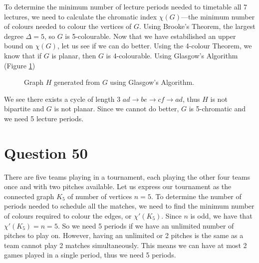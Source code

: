 \documentclass[11pt, oneside]{article}   	%
\begin{document}
To determine the minimum number of lecture periods needed to timetable all 7 lectures, we need to calculate the chromatic index $\chi(G)$---the minimum number of colours needed to colour the vertices of $G$. Using Brooke's Theorem, the largest degree $\Delta =5$, so $G$ is 5-colourable. Now that we have estabilished an upper bound on $\chi(G)$, let us see if we can do better. Using the 4-colour Theorem, we know that if $G$ is planar, then $G$ is 4-colourable. Using Glasgow's Algorithm (Figure \ref{glasgow})

\begin{figure}[h]
	\centering
        \caption{Graph $H$ generated from $G$ using Glasgow's Algorithm.}
        \label{glasgow}
 \end{figure}
 We see there exists a cycle of length 3 $ad \to be \to cf \to ad$, thus $H$ is not bipartite and $G$ is not planar. Since we cannot do better, $G$ is 5-chromatic and we need 5 lecture periods.

\section*{Question 50}

There are five teams playing in a tournament, each playing the other four teams once and with two pitches available. Let us express our tournament as the connected graph $K_5$ of number of vertices $n=5$. To determine the number of periods needed to schedule all the matches, we need to find the minimum number of colours required to colour the edges, or $\chi '(K_5)$. Since $n$ is odd, we have that $\chi '(K_5) = n = 5$. So we need 5 periods if we have an unlimited number of pitches to play on. However, having an unlimited or 2 pitches is the same as a team cannot play 2 matches simultaneously. This means we can have at most 2 games played in a single period, thus we need 5 periods.
\end{document}
